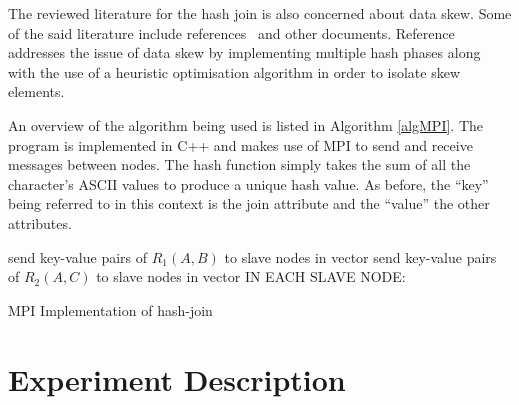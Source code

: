 \documentclass[journal,draftclsnofoot,11pt]{IEEEtran}
\begin{document}
The reviewed literature for the hash join is also concerned about data skew. Some of the said literature include references~\cite{Wolf1990,Keller1991} and other documents. Reference~\cite{Wolf1990} addresses the issue of data skew by implementing multiple hash phases along with the use of a heuristic optimisation algorithm in order to isolate skew elements\cite{Wolf1990}.

An overview of the algorithm being used is listed in Algorithm \ref{algMPI}. The program is implemented in C++ and makes use of MPI to send and receive messages between nodes. The hash function simply takes the sum of all the character's ASCII values to produce a unique hash value. As before, the ``key'' being referred to in this context is the join attribute and the ``value'' the other attributes.
\begin{algorithm}
send key-value pairs of $R_{1}(A,B)$ to slave nodes in vector\;
send key-value pairs of $R_{2}(A,C)$ to slave nodes in vector\;
IN EACH SLAVE NODE:\\
 \caption{MPI Implementation of hash-join}
\label{algMPI}
\end{algorithm}
\section{Experiment Description}\label{desc}

\end{document}
